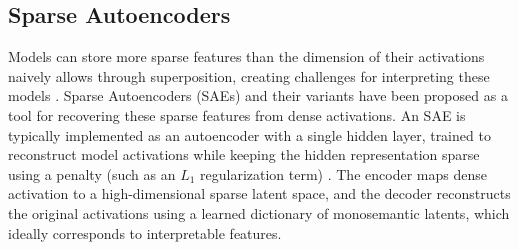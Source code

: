 \subsection*{Sparse Autoencoders} 
Models can store more sparse features than the dimension of their activations naively allows through superposition, creating challenges for interpreting these models \citep{elhage2022toy}. Sparse Autoencoders (SAEs) \citep{bricken2023monosemanticity, leesaes} and their variants \citep{gao2024scaling, bussmann2024batchtopk, rajamanoharan2024jumping, leask2025inference, costa2025evaluating, bussmann2025learning} have been proposed as a tool for recovering these sparse features from dense activations. 
An SAE is typically implemented as an autoencoder with a single hidden layer, trained to reconstruct model activations while keeping the hidden representation sparse using a penalty (such as an $L_1$ regularization term) \citep{huben2024sparse,bricken2023monosemanticity}. 
The encoder maps dense activation to a high-dimensional sparse latent space, and the decoder reconstructs the original activations using a learned dictionary of monosemantic latents, which ideally corresponds to interpretable features.


